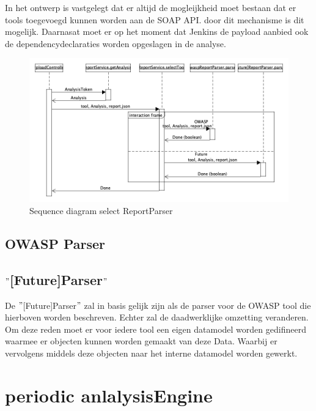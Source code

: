 In het ontwerp is vastgelegt dat er altijd de mogleijkheid moet bestaan dat er tools toegevoegd kunnen worden aan de SOAP API. door dit mechanisme is dit mogelijk. Daarnasat moet er op het moment dat Jenkins de payload aanbied ook de dependencydeclaraties worden opgeslagen in de analyse.

\begin{figure}[bth]
    \myfloatalign
    \includegraphics[width=14cm]{gfx/umlet/exports/SeqSelectReportParser}
    \caption{Sequence diagram select ReportParser}
    \label{fig:selectReportParser}
\end{figure}

\subsection{OWASP Parser}\label{subsec:owasp-parser}

\subsection{$"$[Future]Parser$"$}\label{subsec:$"$[future]parser$"$}
De $"$[Future]Parser$"$ zal in basis gelijk zijn als de parser voor de OWASP tool die hierboven worden beschreven. Echter zal de daadwerklijke omzetting veranderen. Om deze reden moet er voor iedere tool een eigen datamodel worden gedifineerd waarmee er objecten kunnen worden gemaakt van deze Data. Waarbij er vervolgens middels deze objecten naar het interne datamodel worden gewerkt.






\section{periodic anlalysisEngine}

